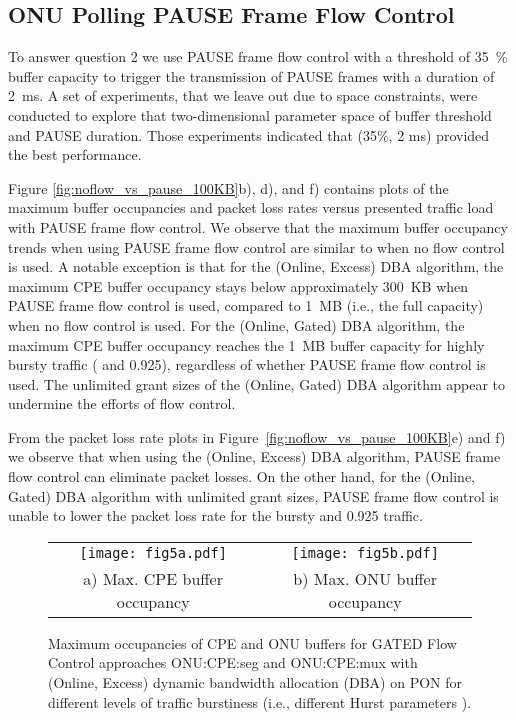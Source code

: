 \documentclass[pdftex,journal]{IEEEtran}
\begin{document}
\subsection{ONU Polling PAUSE Frame Flow Control}
To answer question 2 we use PAUSE frame flow control with a
threshold of 35~\% buffer capacity to trigger the transmission of
PAUSE frames with a duration of 2~ms. A set of experiments, that we
leave out due to space constraints, were conducted to explore that
two-dimensional parameter space of buffer threshold and PAUSE
duration.  Those experiments indicated that (35\%, 2 ms) provided
the best performance.

Figure \ref{fig:noflow_vs_pause_100KB}b), d), and f)
contains plots of the maximum
buffer occupancies and packet loss rates versus presented traffic load
with PAUSE frame flow control.
We observe that the maximum buffer occupancy trends when using PAUSE
frame flow control are similar to when no flow control is used. A
notable exception is that for the (Online, Excess) DBA algorithm,
the maximum CPE buffer occupancy stays below approximately 300~KB
when PAUSE frame flow control is used,
compared to 1~MB (i.e., the full capacity) when no flow control is
used. For the (Online, Gated) DBA algorithm, the maximum CPE
buffer occupancy reaches the 1~MB buffer capacity for highly bursty traffic
( and 0.925), regardless of whether PAUSE frame
flow control is used. The unlimited grant sizes of the
(Online, Gated) DBA algorithm appear to undermine the efforts of flow
control.

From the packet loss rate plots in
Figure~\ref{fig:noflow_vs_pause_100KB}e) and f)
we observe that when using the
(Online, Excess) DBA algorithm, PAUSE frame flow control can
eliminate packet losses. On the other hand, for
the (Online, Gated) DBA algorithm with unlimited grant sizes,
PAUSE frame flow control is unable
to lower the packet loss rate for the bursty  and 0.925 traffic.

\begin{figure*}[t!]
\centering
\begin{tabular}{cc}
\texttt{[image: fig5a.pdf]} &
\texttt{[image: fig5b.pdf]} \\
\footnotesize{a) Max. CPE buffer occupancy} &
\footnotesize{b) Max. ONU buffer occupancy}
\end{tabular}
\caption{Maximum occupancies of CPE and ONU buffers for GATED Flow
Control approaches ONU:CPE:seg and ONU:CPE:mux with (Online, Excess)
dynamic bandwidth allocation (DBA) on PON for different levels of
traffic burstiness (i.e., different Hurst parameters ).}
\label{fig:gated_excess}
\end{figure*}
\end{document}
